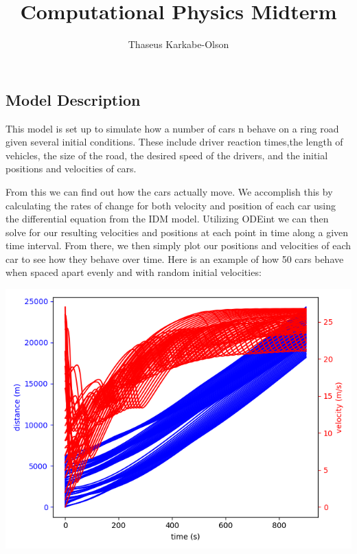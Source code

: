\documentclass[11pt]{article}
\title{Computational Physics Midterm}
\author{Thaseus Karkabe-Olson}
\date{}
\begin{document}
	
	
	\maketitle
	
	\begin{multicols}{2}

	\begin{center}

	\section*{Model Description}

	\end{center}

		\indent This model is set up to simulate how a number of cars n behave on a ring road given several initial conditions. These include driver reaction times,the length of vehicles, the size of the road,
		the desired speed of the drivers, and the initial positions and velocities of cars.

		\indent From this we can find out how the cars actually move. We accomplish this by calculating the rates of change for both velocity and position of each car using the differential equation
		from the IDM model. Utilizing ODEint we can then solve for our resulting velocities and positions at each point in time along a given time interval. From there, we then simply plot our positions and
		velocities of each car to see how they behave over time. Here is an example of how 50 cars behave when spaced apart evenly and with random initial velocities:
	
		\includegraphics[scale = 0.5]{Figure_1.png}


\end{multicols}
\end{document}
